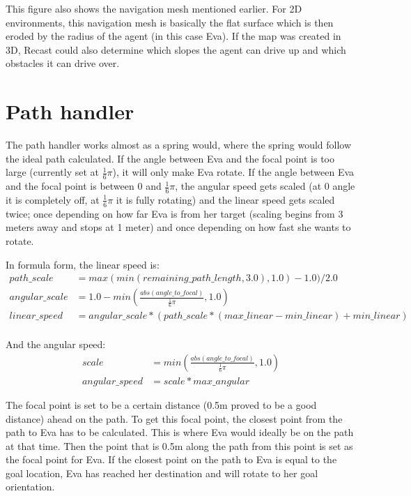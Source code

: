 This figure also shows the navigation mesh mentioned earlier. For 2D environments, this navigation mesh is basically the flat surface which is then eroded by the radius of the agent (in this case Eva). If the map was created in 3D, Recast could also determine which slopes the agent can drive up and which obstacles it can drive over.

\section{Path handler}
The path handler works almost as a spring would, where the spring would follow the ideal path calculated. If the angle between Eva and the focal point is too large (currently set at $\frac{1}{6}\pi$), it will only make Eva rotate. If the angle between Eva and the focal point is between $0$ and $\frac{1}{6}\pi$, the angular speed gets scaled (at 0 angle it is completely off, at $\frac{1}{6}\pi$ it is fully rotating) and the linear speed gets scaled twice; once depending on how far Eva is from her target (scaling begins from 3 meters away and stops at 1 meter) and once depending on how fast she wants to rotate.

In formula form, the linear speed is:
\begin{align*}
	path\_scale& = max(min(remaining\_path\_length, 3.0), 1.0) - 1.0) / 2.0 \\
	angular\_scale& = 1.0 - min(\frac{abs(angle\_to\_focal)}{\frac{1}{6}\pi}, 1.0) \\
	linear\_speed& = angular\_scale * (path\_scale * (max\_linear - min\_linear) + min\_linear) \\
\end{align*}

And the angular speed:
\begin{align*}
	scale& = min(\frac{abs(angle\_to\_focal)}{\frac{1}{6}\pi}, 1.0) \\
	angular\_speed& = scale * max\_angular
\end{align*}

The focal point is set to be a certain distance (0.5m proved to be a good distance) ahead on the path. To get this focal point, the closest point from the path to Eva has to be calculated. This is where Eva would ideally be on the path at that time. Then the point that is 0.5m along the path from this point is set as the focal point for Eva. If the closest point on the path to Eva is equal to the goal location, Eva has reached her destination and will rotate to her goal orientation.